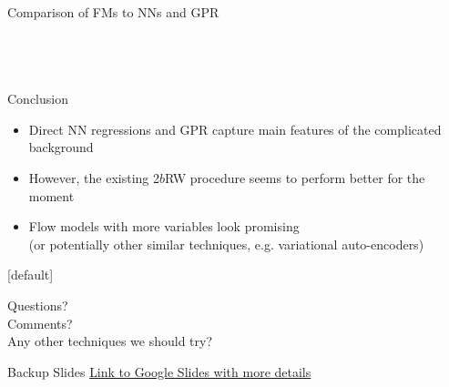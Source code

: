 \documentclass[10pt, aspectratio=169]{beamer}
\begin{document}
\begin{frame}{Comparison of FMs to NNs and GPR}
\begin{columns}[onlytextwidth]
\begin{column}{0.33\textwidth}
    \end{column}
​  \end{columns}
\end{frame}

\begin{frame}{Conclusion}
  \begin{itemize}
    \item Direct NN regressions and GPR capture main features of the complicated background
    \item However, the existing 2$b$RW procedure seems to perform better for the moment
    \item Flow models with more variables look promising\\
    (or potentially other similar techniques, e.g. variational auto-encoders)
  \end{itemize}
\end{frame}

{
[default]
\begin{frame}
  Questions?\\
  Comments?\\
  Any other techniques we should try?
\end{frame}
}

\appendix

\begin{frame}{Backup Slides}
  \centering
  \href{https://docs.google.com/presentation/d/1HImb0b95RuvVrA4HmL7cHfeurqykYyKxsTvzd4683Mw/edit?usp=sharing}{\alert{Link to Google Slides with more details}}
\end{frame}
\end{document}
